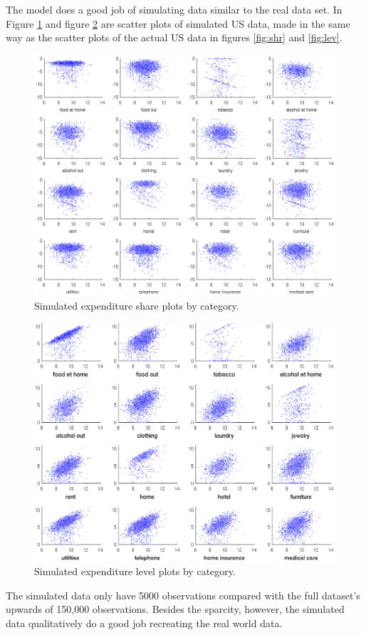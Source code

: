 \documentclass[12pt]{article}
\begin{document}
The model does a good job of simulating data similar to the real data set. In Figure \ref{fig:shares_fake} and figure \ref{fig:levels_fake} are scatter plots of simulated US data, made in the same way as the scatter plots of the actual US data in figures \ref{fig:shr} and \ref{fig:lev}. 
\begin{figure}
	\begin{center}
		\includegraphics[scale=1]{pics/shares_fake_cropped.pdf}
	\end{center}
	\caption{Simulated expenditure share plots by category.}
	\label{fig:shares_fake}
\end{figure}
\begin{figure}
    \begin{center}
	\includegraphics[scale=1]{pics/levels_fake_cropped.pdf}
    \end{center}
    \caption{Simulated expenditure level plots by category.}
    \label{fig:levels_fake}
\end{figure}
The simulated data only have 5000 observations compared with the full dataset's upwards of 150,000 observations. 
Besides the sparcity, however, the simulated data qualitatively do a good job recreating the real world data.
\end{document}
